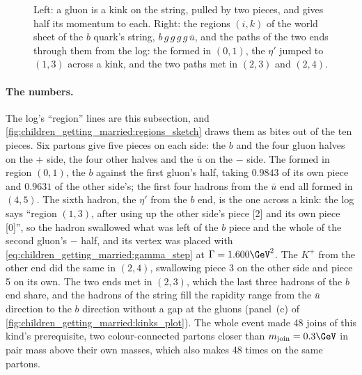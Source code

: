 \begin{figure}[htbp]\centering
\resizebox{\textwidth}{!}{}
\caption[Gluons as kinks and the regions of the $b$ quark's string]{Left:
a gluon is a kink on the string, pulled by two pieces, and gives half its
momentum to each. Right: the regions $(i,k)$ of the world sheet of the $b$
quark's string, $b\,g\,g\,g\,g\,\bar u$, and the paths of the two ends
through them from the  log: the \Bstarbar formed in $(0,1)$, the
$\eta'$ jumped to $(1,3)$ across a kink, and the two paths met in $(2,3)$
and $(2,4)$.}
\label{fig:children_getting_married:kinks_sketch}
\end{figure}

\paragraph{The numbers.} The log's ``region'' lines are this subsection,
and \cref{fig:children_getting_married:regions_sketch} draws them as
bites out of the ten pieces. Six partons give five pieces on each side: the $b$ and the four gluon
halves on the $+$ side, the four other halves and the $\bar u$ on the $-$
side. The \Bstarbar formed in region $(0,1)$, the $b$ against the first
gluon's half, taking $0.9843$ of its own piece and $0.9631$ of the other
side's; the first four hadrons from the $\bar u$ end all formed in $(4,5)$.
The sixth hadron, the $\eta'$ from the $b$ end, is the one across a kink:
the log says ``region $(1,3)$, after using up the other side's piece [2]
and its own piece [0]'', so the hadron swallowed what was left of the $b$
piece and the whole of the second gluon's $-$ half, and its vertex was
placed with \cref{eq:children_getting_married:gamma_step} at
$\Gamma=1.600\GeV^2$. The $K^+$ from the other end did the same in $(2,4)$,
swallowing piece 3 on the other side and piece 5 on its own. The two ends
met in $(2,3)$, which the last three hadrons of the $b$ end share, and the
hadrons of the string fill the rapidity range from the $\bar u$ direction
to the $b$ direction without a gap at the gluons (panel~(c) of
\cref{fig:children_getting_married:kinks_plot}). The whole event made
48 joins of this kind's prerequisite, two colour-connected partons closer
than $m_{\mathrm{join}}=0.3\GeV$ in pair mass above their own masses,
which \PYTHIA also makes 48 times on the same partons.

